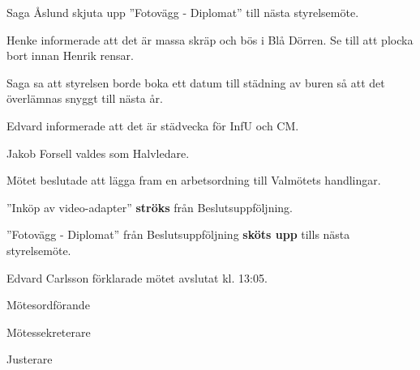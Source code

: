 \documentclass[10pt]{article}
\def\mo{Edvard Carlsson}
\def\ms{Mattias Lundström}
\def\ji{Jonathan Benitez}
\begin{document}
\begin{paragrafer}
Saga Åslund \ypa skjuta upp ''Fotovägg - Diplomat'' till nästa styrelsemöte.

\Mbaby


Henke informerade att det är massa skräp och bös i Blå Dörren. Se till att plocka bort innan Henrik rensar. 

Saga sa att styrelsen borde boka ett datum till städning av buren så att det överlämnas snyggt till nästa år. 

Edvard informerade att det är städvecka för InfU och CM. 



Jakob Forsell valdes som Halvledare.

Mötet beslutade att lägga fram en arbetsordning till Valmötets handlingar.

''Inköp av video-adapter'' \textbf{ströks} från Beslutsuppföljning.

''Fotovägg - Diplomat'' från Beslutsuppföljning \textbf{sköts upp} tills nästa styrelsemöte. 


{\mo} förklarade mötet avslutat kl. 13:05.
\end{paragrafer}

\hidesignfoot
\begin{signatures}{3}
\signature{\mo}{Mötesordförande}
\signature{\ms}{Mötessekreterare}
\signature{\ji}{Justerare}
\end{signatures}
\end{document}

